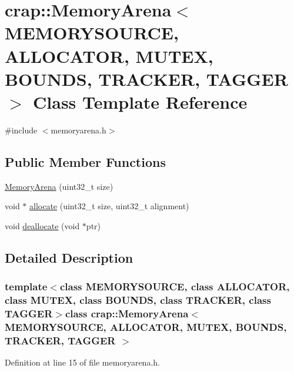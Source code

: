 \hypertarget{classcrap_1_1_memory_arena}{\section{crap\+:\+:Memory\+Arena$<$ M\+E\+M\+O\+R\+Y\+S\+O\+U\+R\+C\+E, A\+L\+L\+O\+C\+A\+T\+O\+R, M\+U\+T\+E\+X, B\+O\+U\+N\+D\+S, T\+R\+A\+C\+K\+E\+R, T\+A\+G\+G\+E\+R $>$ Class Template Reference}
\label{classcrap_1_1_memory_arena}
}


{\ttfamily \#include $<$memoryarena.\+h$>$}

\subsection*{Public Member Functions}
\begin{DoxyCompactItemize}
\item 
\hyperlink{classcrap_1_1_memory_arena_aac47e99b138e62497fb2f9c7db776214}{Memory\+Arena} (uint32\+\_\+t size)
\item 
void $\ast$ \hyperlink{classcrap_1_1_memory_arena_ab0b57539e9f0be9d579c04276ad7e201}{allocate} (uint32\+\_\+t size, uint32\+\_\+t alignment)
\item 
void \hyperlink{classcrap_1_1_memory_arena_aaae73e3840335dc8ac87f3185d7805a8}{deallocate} (void $\ast$ptr)
\end{DoxyCompactItemize}


\subsection{Detailed Description}
\subsubsection*{template$<$class M\+E\+M\+O\+R\+Y\+S\+O\+U\+R\+C\+E, class A\+L\+L\+O\+C\+A\+T\+O\+R, class M\+U\+T\+E\+X, class B\+O\+U\+N\+D\+S, class T\+R\+A\+C\+K\+E\+R, class T\+A\+G\+G\+E\+R$>$class crap\+::\+Memory\+Arena$<$ M\+E\+M\+O\+R\+Y\+S\+O\+U\+R\+C\+E, A\+L\+L\+O\+C\+A\+T\+O\+R, M\+U\+T\+E\+X, B\+O\+U\+N\+D\+S, T\+R\+A\+C\+K\+E\+R, T\+A\+G\+G\+E\+R $>$}



Definition at line 15 of file memoryarena.\+h.



